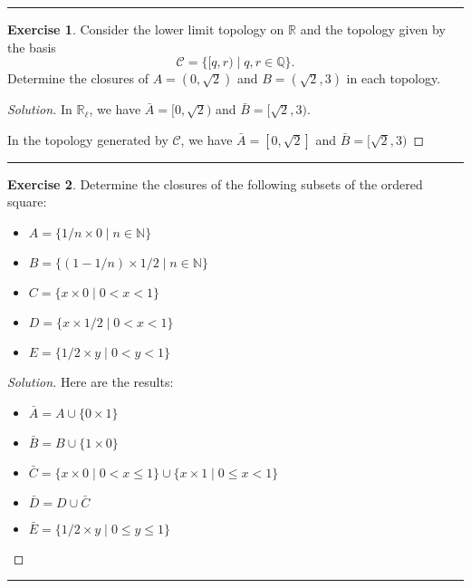 \documentclass{article}
\theoremstyle{definition}
\newtheorem{exercise}{Exercise}[section]
\begin{document}
\hrule

\begin{exercise}
  Consider the lower limit topology on $\mathbb{R}$ and the topology given by the basis
  $$\mathcal{C} = \{[q,r)\mid q,r\in\mathbb{Q}\}.$$
  Determine the closures of $A = (0,\sqrt{2})$ and $B = (\sqrt{2},3)$ in each topology.
\end{exercise}
\begin{proof}[Solution]
  In $\mathbb{R}_\ell$, we have $\bar{A} = [0,\sqrt{2})$ and $\bar{B} =[\sqrt{2},3)$.

  In the topology generated by $\mathcal{C}$, we have $\bar{A} = [0,\sqrt{2}]$ and $\bar{B} = [\sqrt{2},3)$
\end{proof}

\hrule

\begin{exercise}
  Determine the closures of the following subsets of the ordered square:
  \begin{itemize}
    \item[] $A = \{1/n\times 0\mid n\in\mathbb{N}\}$
    \item[] $B = \{(1-1/n)\times 1/2\mid n\in\mathbb{N}\}$
    \item[] $C = \{x\times 0\mid 0<x<1\}$
    \item[] $D = \{x\times 1/2\mid 0<x<1\}$
    \item[] $E = \{1/2\times y\mid 0<y<1\}$
  \end{itemize}
\end{exercise}
\begin{proof}[Solution]
  Here are the results:
  \begin{itemize}
    \item $\bar{A} = A\cup\{0\times 1\}$
    \item $\bar{B} = B\cup\{1\times 0\}$
    \item $\bar{C} = \{x\times 0\mid 0 < x\le 1\}\cup \{x\times 1\mid 0\le x < 1\}$
    \item $\bar{D} = D\cup \bar{C}$
    \item $\bar{E} = \{1/2\times y\mid 0\le y\le 1\}$
  \end{itemize}
\end{proof}

\hrule
\end{document}
